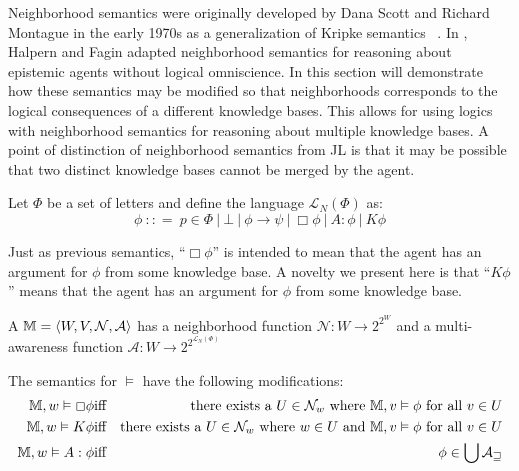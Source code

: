 Neighborhood semantics were originally developed by Dana Scott and Richard
Montague in the early 1970s as a generalization of Kripke semantics \
{\cite{montague_universal_2008,scott_advice_1970}}.  In
{\cite{fagin_belief_1988}}, Halpern and Fagin adapted neighborhood semantics
for reasoning about epistemic agents without logical omniscience.  In this
section will demonstrate how these semantics may be modified so that
neighborhoods corresponds to the logical consequences of a different knowledge
bases.  This allows for using logics with neighborhood semantics for
reasoning about multiple knowledge bases.  A point of distinction of
neighborhood semantics from JL is that it may be possible that two distinct
knowledge bases cannot be merged by the agent.

\begin{definition}
  Let $\Phi$ be a set of letters and define the language $\mathcal{L}_N (\Phi)$ as:
  \[ \phi\ : : =\ p \in \Phi\ |
    \ \bot\ |\ \phi \rightarrow \psi
    \ |\ \Box \phi\ |\ A :
     \phi\ |\ K \phi \]
\end{definition}

Just as previous semantics, ``$\Box \phi$'' is intended to mean that the agent
has an argument for $\phi$ from some knowledge base.  A novelty we present
here is that ``$K \phi$'' means that the agent has an argument for $\phi$ from
some \tmtextit{sound} knowledge base.

\begin{definition}
  \label{neighborhoodmodels}A {} $\mathbbm{M}=
  \langle W, V, \mathcal{N}, \mathcal{A} \rangle$ has a neighborhood function
  $\mathcal{N} : W \rightarrow 2^{2^W}$ and a multi-awareness function
  $\mathcal{A} : W \rightarrow 2^{2^{\mathcal{L}_N (\Phi)}}$
  
  
  
  The semantics for $\vDash$ have the following modifications:
  \begin{eqnarray*}
    \mathbbm{M}, w \vDash \Box \phi & \text{iff} & \text{there exists a $U \in
    \mathcal{N}_w$ where $\mathbbm{M}, v \vDash \phi$ for all $v \in U$}\\
    \mathbbm{M}, w \vDash K \phi & \text{iff} & \text{there exists a $U \in
    \mathcal{N}_w$ where $w \in U$ and $\mathbbm{M}, v \vDash \phi$ for all $v
    \in U$}\\
    \mathbbm{M}, w \vDash A : \phi & \text{iff} & \phi \in \bigcup
    \mathcal{A_w}
  \end{eqnarray*}
\end{definition}

